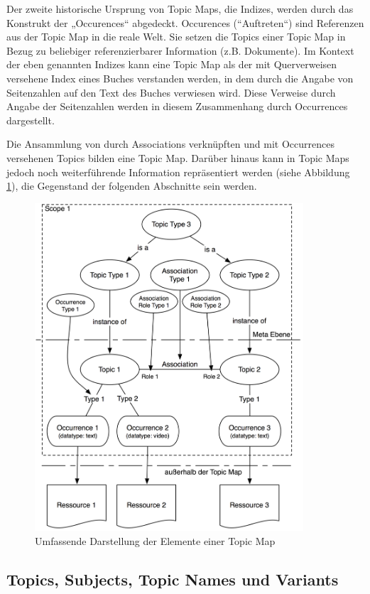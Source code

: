 Der zweite historische Ursprung von Topic Maps, die Indizes, werden durch das Konstrukt der „Occurences“ abgedeckt. Occurences (“Auftreten“) sind Referenzen aus der Topic Map in die reale Welt. Sie setzen die Topics einer Topic Map in Bezug zu beliebiger referenzierbarer Information (z.B. Dokumente). Im Kontext der eben genannten Indizes kann eine Topic Map als der mit Querverweisen versehene Index eines Buches verstanden werden, in dem durch die Angabe von Seitenzahlen auf den Text des Buches verwiesen wird. Diese Verweise durch Angabe der Seitenzahlen werden in diesem Zusammenhang durch Occurrences dargestellt.

Die Ansammlung von durch Associations verknüpften und mit Occurrences versehenen Topics bilden eine Topic Map. Darüber hinaus kann in Topic Maps jedoch noch weiterführende Information repräsentiert werden (siehe Abbildung \ref{fig:img_Persistenz_TMFull}), die Gegenstand der folgenden Abschnitte sein werden.

\begin{figure}[htbp]
	\centering
		\includegraphics[width=10cm]{img/Persistenz/TMFull.png}
	\caption{Umfassende Darstellung der Elemente einer Topic Map}
	\label{fig:img_Persistenz_TMFull}
\end{figure}

\subsection{Topics, Subjects, Topic Names und Variants} %
\label{sub:topics_subjects_topic_names_und_variants}

